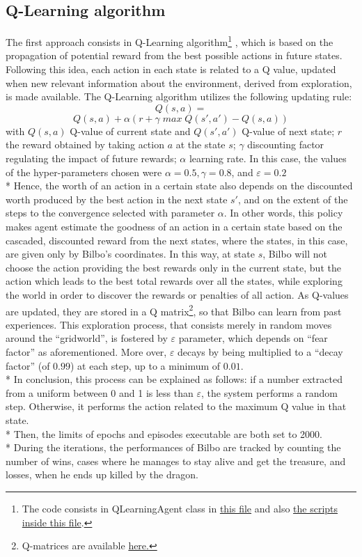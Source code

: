 \subsection{Q-Learning algorithm}
The first approach consists in Q-Learning algorithm\footnote{The code consists in QLearningAgent class in \href{https://github.com/moiraghif/DragonHunting/blob/master/Bilbo\%20World/agents.py}{this file} and also \href{https://github.com/moiraghif/DragonHunting/blob/master/Bilbo\%20World/Bilbo_q_learning.py}{the scripts inside this file}.} \cite{2}, which is based on the propagation of potential reward from the best possible actions in future states. Following this idea, each action in each state is related to a Q value, updated when new relevant information about the environment, derived from exploration, is made available. The Q-Learning algorithm utilizes the following updating rule:
$$Q(s,a)=$$ 
$$Q(s,a)+\alpha(r+\gamma\;max\;Q(s',a') - Q(s,a))$$
with $Q(s,a)$ Q-value of current state and $Q(s',a')$ Q-value of next state; $r$ the reward obtained by taking action $a$ at the state $s$; $\gamma$ discounting factor regulating the impact of future rewards; $\alpha$ learning rate. In this case, the values of the hyper-parameters chosen were $\alpha=0.5, \gamma=0.8$, and $\varepsilon=0.2$\\*
Hence, the worth of an action in a certain state also depends on the discounted worth produced by the best action in the next state $s'$, and on the extent of the steps to the convergence selected with parameter $\alpha$. In other words, this policy makes agent estimate the goodness of an action in a certain state based on the cascaded, discounted reward from the next states, where the states, in this case, are given only by Bilbo's coordinates. 
In this way, at state $s$, Bilbo will not choose the action providing the best rewards only in the current state, but the action which leads to the best total rewards over all the states, while exploring the world in order to discover the rewards or penalties of all action. As Q-values are updated, they are stored in a Q matrix\footnote{Q-matrices are available \href{https://github.com/moiraghif/DragonHunting/tree/master/Bilbo\%20World/models}{here.}}, so that Bilbo can learn from past experiences. This exploration process, that consists merely in random moves around the ``gridworld'', is fostered by $\varepsilon$ parameter, which depends on ``fear factor'' as aforementioned. More over, $\varepsilon$ decays by being multiplied to a ``decay factor'' (of $0.99$) at each step, up to a minimum of $0.01$.\\*
In conclusion, this process can be explained as follows: if a number extracted from a uniform between 0 and 1 is less than $\varepsilon$, the system performs a random step. Otherwise, it performs the action related to the maximum Q value in that state.\\* 
Then, the limits of epochs and episodes executable are both set to 2000.\\*
During the iterations, the performances of Bilbo are tracked by counting the number of wins, cases where he manages to stay alive and get the treasure, and losses, when he ends up killed by the dragon.

